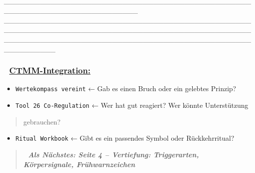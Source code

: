 🧠 \_\_\_\_\_\_\_\_\_\_\_\_\_\_\_\_\_\_\_\_\_\_\_\_\_\_\_\_\_\_\_\_\_\_\_\_\_\_\_\_\_\_\_\_\_\_\_\_\_\_\_\_\_\_\_\_\_\_\_\_\_\_\_\_\_\_\_\_\_\_\_\_\_\_ \_\_\_\_\_\_\_\_\_\_\_\_\_\_\_\_\_\_\_\_\_\_\_\_\_\_\_\_\_\_\_\_\_\_\_\_\_\_\_\_\_\_\_\_\_\_\_\_\_\_\_\_\_\_\_\_\_\_\_\_\_\_\_\_\_\_\_\_\_\_\_\_\_\_\_\_\_\_\_\_\_\_\_\_\_\_\_\_\_\_\_\_\_\_\_\_\_\_\_\_\_\_\_\_\_\_\_\_\_\_\_\_\_\_\_\_\_\_\_\_\_\_\_\_\_\_\_\_\_\_\_\_\_\_\_\_\_\_\_\_\_\_\_\_\_\_\_\_\_\_\_\_\_\_

\hypertarget{ctmm-integration}{%
\subsubsection{\texorpdfstring{📎 \textbf{\ul{CTMM-Integration:}}}{📎 CTMM-Integration:}}\label{ctmm-integration}}

\begin{itemize}
\tightlist
\item
  \texttt{W}\texttt{erte}\texttt{k}\texttt{ompass}\texttt{\ }\texttt{vereint} ← Gab es einen Bruch oder ein gelebtes Prinzip?
\item
  \texttt{T}\texttt{ool}\texttt{\ }\texttt{26}\texttt{\ C}\texttt{o}\texttt{-R}\texttt{egulation} ← Wer hat gut reagiert? Wer könnte Unterstützung
\end{itemize}

\begin{quote}
gebrauchen?
\end{quote}

\begin{itemize}
\tightlist
\item
  \texttt{R}\texttt{itual}\texttt{\ W}\texttt{orkbook} ← Gibt es ein passendes Symbol oder Rückkehrritual?
\end{itemize}

\begin{quote}
\emph{\textbf{📎 Als Nächstes: Seite 4 -- Vertiefung: Triggerarten, Körpersignale, Frühwarnzeichen}}
\end{quote}


